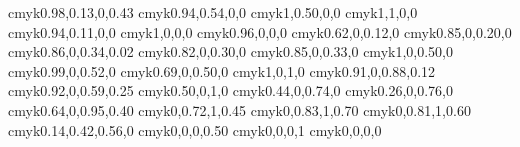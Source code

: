 \documentclass[12pt,a4paper]{article}
\begin{document}
\begin{multicols}{3}
  {cmyk}{0.98,0.13,0,0.43}
      {cmyk}{0.94,0.54,0,0}
     {cmyk}{1,0.50,0,0}
          {cmyk}{1,1,0,0}
      {cmyk}{0.94,0.11,0,0}
          {cmyk}{1,0,0,0}
   {cmyk}{0.96,0,0,0}
       {cmyk}{0.62,0,0.12,0}
     {cmyk}{0.85,0,0.20,0}
      {cmyk}{0.86,0,0.34,0.02}
    {cmyk}{0.82,0,0.30,0}
     {cmyk}{0.85,0,0.33,0}
       {cmyk}{1,0,0.50,0}
   {cmyk}{0.99,0,0.52,0}
      {cmyk}{0.69,0,0.50,0}
         {cmyk}{1,0,1,0}
   {cmyk}{0.91,0,0.88,0.12}
     {cmyk}{0.92,0,0.59,0.25}
     {cmyk}{0.50,0,1,0}
   {cmyk}{0.44,0,0.74,0}
   {cmyk}{0.26,0,0.76,0}
    {cmyk}{0.64,0,0.95,0.40}
     {cmyk}{0,0.72,1,0.45}
         {cmyk}{0,0.83,1,0.70}
         {cmyk}{0,0.81,1,0.60}
           {cmyk}{0.14,0.42,0.56,0}
          {cmyk}{0,0,0,0.50}
         {cmyk}{0,0,0,1}
         {cmyk}{0,0,0,0}
\end{multicols}
\end{document}
